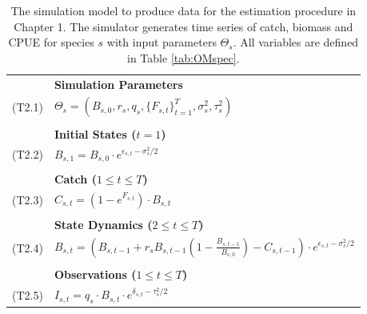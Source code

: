 \documentclass[]{scrartcl}
\begin{document}
\newpage

\begin{table}[htbp]
\begin{center}
\caption{The simulation model to produce data for the estimation procedure in Chapter 1. The simulator generates time series of catch, biomass and CPUE for species $s$ with input parameters $\Theta_s$. All variables are defined in Table \ref{tab:OMspec}.}\label{tab:Ch1sim}
\begin{tabular}{cl}
\hline
& \textbf{Simulation Parameters} \\
(T2.1) & $\Theta_s = \left( B_{s,0}, r_s, q_s, 
                          \{F_{s,t}\}_{t = 1}^{T},
                          \sigma_s^2, \tau_s^2 \right)$ \\
& \\
& \textbf{ Initial States ($t = 1$) } \\
(T2.2) & $B_{s,1} = B_{s,0} \cdot e^{\epsilon_{s,t} - \sigma_s^2/2}$ \\
& \\
& \textbf{ Catch ($1 \leq t \leq T$) } \\
(T2.3) & $C_{s,t} = \left(1 - e^{F_{s,t}}\right)\cdot B_{s,t}$ \\
& \\
& \textbf{ State Dynamics ($2 \leq t \leq T$)} \\
(T2.4) & $B_{s,t} = \left ( B_{s,t-1} + r_sB_{s,t-1}\left( 1 - \frac{B_{s,t-1}}{B_{s,0}} \right) - C_{s,{t-1} } \right) \cdot e^{\epsilon_{s,t} - \sigma_s^2/2}$ \\
& \\
& \textbf{ Observations ($1 \leq t \leq T$)} \\
(T2.5) & $I_{s,t} = q_s \cdot B_{s,t} \cdot e^{\delta_{s,t} - \tau_s^2/2}$ \\
\hline
\end{tabular}
\end{center}
\end{table}

\newpage
\end{document}
